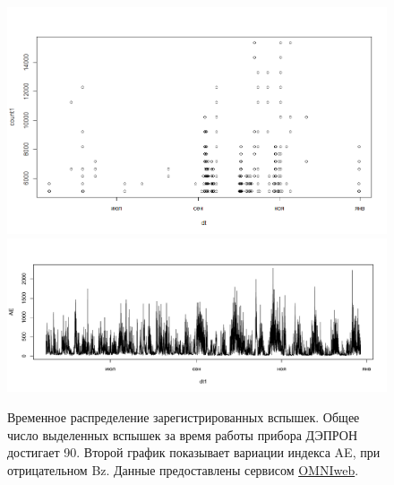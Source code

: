 \begin{figure}[h]
	\centering
	\includegraphics[width=0.7\linewidth, trim={0 2cm 0 0}, clip]{images/Flash/Rplot03.png}
	\includegraphics[width=0.7\linewidth, trim={0 1.5cm 0 1cm}, clip]{images/Flash/Rplot01}
	\caption{Временное распределение зарегистрированных вспышек. Общее число выделенных вспышек за время работы прибора ДЭПРОН достигает 90. Второй график показывает вариации индекса AE, при отрицательном Bz. Данные предоставлены сервисом  \href{https://omniweb.gsfc.nasa.gov/}{OMNIweb}.}
	\label{fig:rplot03}
\end{figure}


